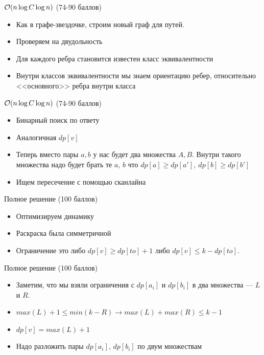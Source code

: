 \begin{frame}{$\mathcal{O}(n \log C \log n)$ (74-90 баллов)}
  \begin{itemize}
    \item Как в графе-звездочке, строим новый граф для путей.
    \item Проверяем на двудольность
    \item Для каждого ребра становится известен класс эквивалентности
    \item Внутри классов эквивалентности мы знаем ориентацию ребер, относительно <<основного>> ребра внутри класса
  \end{itemize}
\end{frame}

\begin{frame}{$\mathcal{O}(n \log C \log n)$ (74-90 баллов)}
  \begin{itemize}
    \item Бинарный поиск по ответу
    \item Аналогичная $dp[v]$
    \item Теперь вместо пары $a, b$ у нас будет два множества $A, B$. Внутри такого множества надо будет брать те $a,\,b$ что $dp[a] \ge dp[a'],\ dp[b] \ge dp[b']$
    \item Ищем пересечение с помощью сканлайна
  \end{itemize}
\end{frame}

\begin{frame}{Полное решение (100 баллов)}
  \begin{itemize}
    \item Оптимизируем динамику
    \item Раскраска была симметричной
    \item Ограничение это либо $dp[v] \ge dp[to] + 1$ либо $dp[v] \le k - dp[to]$.
  \end{itemize}
\end{frame}

\begin{frame}{Полное решение (100 баллов)}
  \begin{itemize}  
    \item Заметим, что мы взяли ограничения с $dp[a_i]$ и $dp[b_i]$ в два множества --- $L$ и $R$.  
    \item $max(L) + 1 \le min(k - R) \rightarrow max(L) + max(R) \le k - 1$
    \item $dp[v] = max(L) + 1$
    \item Надо разложить пары $dp[a_i],\,dp[b_i]$ по двум множествам
  \end{itemize}
\end{frame}

